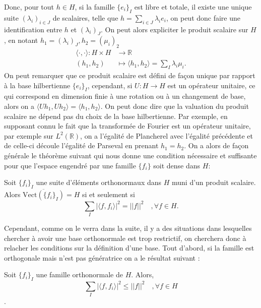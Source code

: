 Donc, pour tout $h \in H$, si la famille $\{e_i\}_I$ est libre et totale, il existe une unique suite $(\lambda_i)_{i \in J}$ de scalaires, telle que $ h = \sum_{i \in J} \lambda_i e_i$, on peut donc faire une identification entre $h$ et $(\lambda_i)_J$.
	On peut alors expliciter le produit scalaire sur $H$, en notant $h_1 = (\lambda_i)_J, h_2=(\mu_i)_2$
\begin{align}
	\langle \cdot, \cdot \rangle :  H \times H &\longrightarrow \mathbb{R} \\
		(h_1, h_2 ) &\longmapsto \langle h_1, h_2 \rangle = \sum_I \lambda_i \mu_i.
\end{align}
On peut remarquer que ce produit scalaire est défini de façon unique par rapport à la base hilbertienne $\{e_i\}_I$, cependant, si $U:H\rightarrow H$ est un opérateur unitaire, ce qui correspond en dimension finie à une rotation ou à un changement de base, alors on a $\langle Uh_1, Uh_2 \rangle = \langle h_1, h_2 \rangle$.
On peut donc dire que la valuation du produit scalaire ne dépend pas du choix de la base hilbertienne.
Par exemple,  en supposant connu le fait que la transformée de Fourier est un opérateur unitaire, par exemple sur $L^2(\mathbb{R})$, on a l'égalité de Plancherel avec l'égalité précédente et de celle-ci découle l'égalité de Parseval en prenant $h_1 = h_2$.
On a alors de façon générale le théorème suivant qui nous donne une condition nécessaire et suffisante pour que l'espace engendré par une famille $\{f_i\}$ soit dense dans $H$:
\begin{theoreme}
	Soit $\{f_i\}_I$ une suite d'éléments orthonormaux dans $H$ muni d'un produit scalaire.
	Alors $\overline{\text{Vect}(\{f_i\}_I)} = H$ si et seulement si 
	\begin{equation*}
		\sum_I |\langle f, f_i\rangle|^2 = ||f||^2 \quad, \forall f \in H.
	\end{equation*}
\end{theoreme}
Cependant, comme on le verra dans la suite, il y a des situations dans lesquelles chercher à avoir une base orthonormale est trop restrictif, on cherchera donc à relacher les conditions sur la définition d'une base.
\newline
Tout d'abord, si la famille est orthogonale mais n'est pas génératrice on a le résultat suivant :
\begin{theoreme}\label{th:orth1}
	Soit $\{f_i\}_I$ une famille orthonormale de $H$.
	Alors,
	\begin{equation*}
		\sum_I |\langle f, f_i \rangle|^2 \leq ||f||^2 \quad, \forall f \in H
	\end{equation*}.
\end{theoreme}
